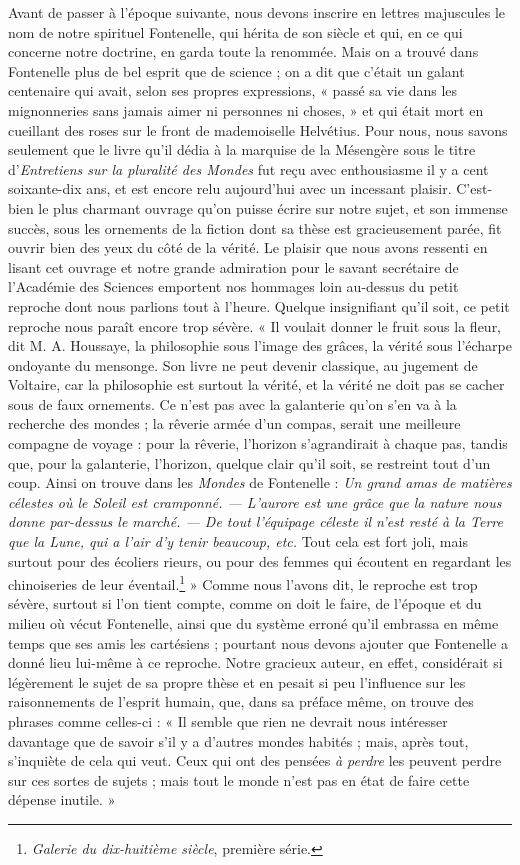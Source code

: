 \documentclass[a4paper, 11pt, oneside]{article}
\begin{document}
Avant de passer à l'époque suivante, nous devons inscrire en lettres majuscules le nom de notre spirituel Fontenelle, qui hérita de son siècle et qui, en ce qui concerne notre doctrine, en garda toute la renommée. Mais on a trouvé dans Fontenelle plus de bel esprit que de science ; on a dit que c'était un galant centenaire qui avait, selon ses propres expressions, « passé sa vie dans les mignonneries sans jamais aimer ni personnes ni choses, » et qui était mort en cueillant des roses sur le front de mademoiselle Helvétius. Pour nous, nous savons seulement que le livre qu'il dédia à la marquise de la Mésengère sous le titre d'\emph{Entretiens sur la pluralité des Mondes} fut reçu avec enthousiasme il y a cent soixante-dix ans, et est encore relu aujourd'hui avec un incessant plaisir. C'est-bien le plus charmant ouvrage qu'on puisse écrire sur notre sujet, et son immense succès, sous les ornements de la fiction dont sa thèse est gracieusement parée, fit ouvrir bien des yeux du côté de la vérité. Le plaisir que nous avons ressenti en lisant cet ouvrage et notre grande admiration pour le savant secrétaire de l'Académie des Sciences emportent nos hommages loin au-dessus du petit reproche dont nous parlions tout à l'heure. Quelque insignifiant qu'il soit, ce petit reproche nous paraît encore trop sévère. « Il voulait donner le fruit sous la fleur, dit M. A. Houssaye, la philosophie sous l'image des grâces, la vérité sous l'écharpe ondoyante du mensonge. Son livre ne peut devenir classique, au jugement de Voltaire, car la philosophie est surtout la vérité, et la vérité ne doit pas se cacher sous de faux ornements. Ce n'est pas avec la galanterie qu'on s'en va à la recherche des mondes ; la rêverie armée d'un compas, serait une meilleure compagne de voyage : pour la rêverie, l'horizon s'agrandirait à chaque pas, tandis que, pour la galanterie, l'horizon, quelque clair qu'il soit, se restreint tout d'un coup. Ainsi on trouve dans les \emph{Mondes} de Fontenelle : \emph{Un grand amas de matières célestes où le Soleil est cramponné. --- L'aurore est une grâce que la nature nous donne par-dessus le marché. --- De tout l'équipage céleste il n'est resté à la Terre que la Lune, qui a l'air d'y tenir beaucoup, etc.} Tout cela est fort joli, mais surtout pour des écoliers rieurs, ou pour des femmes qui écoutent en regardant les chinoiseries de leur éventail.\footnote{\emph{Galerie du dix-huitième siècle}, première série.} » Comme nous l'avons dit, le reproche est trop sévère, surtout si l'on tient compte, comme on doit le faire, de l'époque et du milieu où vécut Fontenelle, ainsi que du système erroné qu'il embrassa en même temps que ses amis les cartésiens ; pourtant nous devons ajouter que Fontenelle a donné lieu lui-même à ce reproche. Notre gracieux auteur, en effet, considérait si légèrement le sujet de sa propre thèse et en pesait si peu l'influence sur les raisonnements de l'esprit humain, que, dans sa préface même, on trouve des phrases comme celles-ci : « Il semble que rien ne devrait nous intéresser davantage que de savoir s'il y a d'autres mondes habités ; mais, après tout, s'inquiète de cela qui veut. Ceux qui ont des pensées \emph{à perdre} les peuvent perdre sur ces sortes de sujets ; mais tout le monde n'est pas en état de faire cette dépense inutile. »
\end{document}
